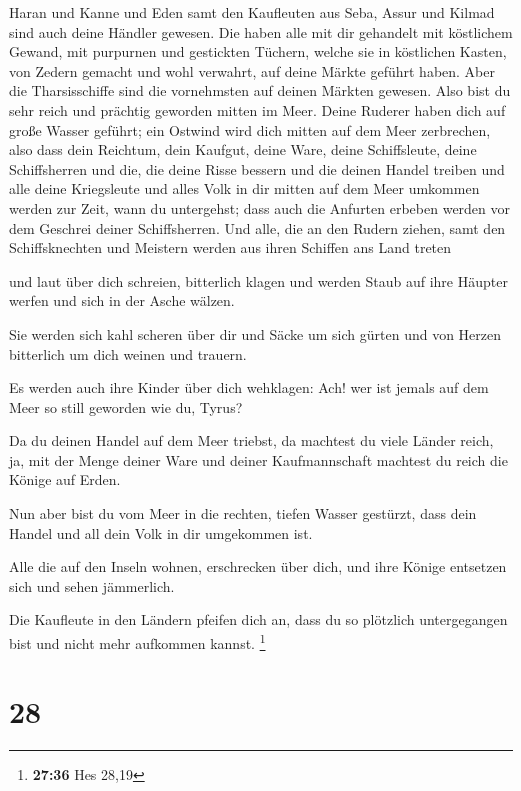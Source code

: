  Haran und Kanne und Eden samt den Kaufleuten aus Seba,
Assur und Kilmad sind auch deine Händler gewesen.  Die
haben alle mit dir gehandelt mit köstlichem Gewand, mit purpurnen und
gestickten Tüchern, welche sie in köstlichen Kasten, von Zedern gemacht
und wohl verwahrt, auf deine Märkte geführt haben.  Aber
die Tharsisschiffe sind die vornehmsten auf deinen Märkten gewesen. Also
bist du sehr reich und prächtig geworden mitten im Meer. 
Deine Ruderer haben dich auf große Wasser geführt; ein Ostwind wird dich
mitten auf dem Meer zerbrechen,  also dass dein Reichtum,
dein Kaufgut, deine Ware, deine Schiffsleute, deine Schiffsherren und
die, die deine Risse bessern und die deinen Handel treiben und alle
deine Kriegsleute und alles Volk in dir mitten auf dem Meer umkommen
werden zur Zeit, wann du untergehst;  dass auch die
Anfurten erbeben werden vor dem Geschrei deiner Schiffsherren.
 Und alle, die an den Rudern ziehen, samt den
Schiffsknechten und Meistern werden aus ihren Schiffen ans Land treten

 und laut über dich schreien, bitterlich klagen und
werden Staub auf ihre Häupter werfen und sich in der Asche wälzen.

 Sie werden sich kahl scheren über dir und Säcke um sich
gürten und von Herzen bitterlich um dich weinen und trauern.

 Es werden auch ihre Kinder über dich wehklagen: Ach! wer
ist jemals auf dem Meer so still geworden wie du, Tyrus?

 Da du deinen Handel auf dem Meer triebst, da machtest du
viele Länder reich, ja, mit der Menge deiner Ware und deiner
Kaufmannschaft machtest du reich die Könige auf Erden.

 Nun aber bist du vom Meer in die rechten, tiefen Wasser
gestürzt, dass dein Handel und all dein Volk in dir umgekommen ist.

 Alle die auf den Inseln wohnen, erschrecken über dich,
und ihre Könige entsetzen sich und sehen jämmerlich.

 Die Kaufleute in den Ländern pfeifen dich an, dass du so
plötzlich untergegangen bist und nicht mehr aufkommen kannst.
\footnote{\textbf{27:36} Hes 28,19}

\hypertarget{section-8}{%
\section{28}\label{section-8}}

